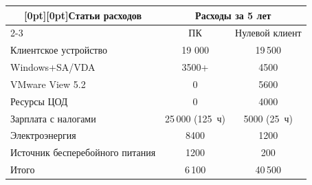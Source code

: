   \begin{table}[b]\small

\vspace*{-9pt}

  \begin{center}


  \vspace*{2ex}

  

\tabcolsep=12pt

  \begin{tabular}{|l|c|c|}

  \hline %

\multicolumn{1}{|c|}{\raisebox{-6pt}[0pt][0pt]{Статьи расходов}} &

\multicolumn{2}{c|}{Расходы за 5 лет}\\

\cline{2-3}

&ПК&Нулевой клиент\\

\hline

Клиентское устройство&19 000&19\,500\\

Windows\;+\;SA/VDA&3500\;+\;3000&4500\\

VMware View 5.2&0&5600\\

Ресурсы ЦОД&0&4000\\

Зарплата с налогами&25\,000 (125~ч)&5000 (25~ч)\\

Электроэнергия&8400&1200\\

Источник бесперебойного питания&1200&200\\

\hline

Итого&6\,100&40\,500\\

\hline

\end{tabular}

\end{center}

\end{table}



